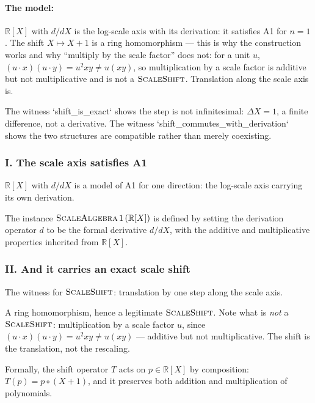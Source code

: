 \paragraph{The model:}

$\mathbb{R}[X]$ with $d/dX$ is the log-scale axis with its derivation: it satisfies A1
for $n = 1$.  The shift $X \mapsto X + 1$ is a ring homomorphism — this is why the
construction works and why ``multiply by the scale factor'' does not: for a unit
$u$, $(u \cdot x)(u \cdot y) = u^2xy \neq u(xy)$, so multiplication by a scale factor is
additive but not multiplicative and is not a $\text{\textsc{ScaleShift}}$.  Translation along
the scale axis is.

The witness `shift\_is\_exact` shows the step is not infinitesimal: $\Delta X = 1$, a
finite difference, not a derivative.  The witness `shift\_commutes\_with\_derivation` shows
the two structures are compatible rather than merely coexisting.

\subsubsection*{I. The scale axis satisfies A1}

\begin{definition}
\label{def:polyScaleAlgebra}
$\mathbb{R}[X]$ with $d/dX$ is a model of A1 for one direction: the log-scale
axis carrying its own derivation. 

The instance $\text{\textsc{ScaleAlgebra}} \, 1 \, (\mathbb{R}[X])$ is defined by setting the derivation
operator $d$ to be the formal derivative $d/dX$, with the additive and multiplicative
properties inherited from $\mathbb{R}[X]$.
\end{definition}

\subsubsection*{II. And it carries an exact scale shift}

\begin{definition}
\label{def:polyShift}
The witness for $\text{\textsc{ScaleShift}}$: translation by one step along the scale axis.

A ring homomorphism, hence a legitimate $\text{\textsc{ScaleShift}}$.  Note what is \emph{not} a
$\text{\textsc{ScaleShift}}$: multiplication by a scale factor $u$, since
$(u \cdot x)(u \cdot y) = u^2xy \neq u(xy)$ — additive but not multiplicative.  The shift
is the translation, not the rescaling.

Formally, the shift operator $T$ acts on $p \in \mathbb{R}[X]$ by composition:
$T(p) = p \circ (X + 1)$, and it preserves both addition and multiplication of
polynomials.
\end{definition}

